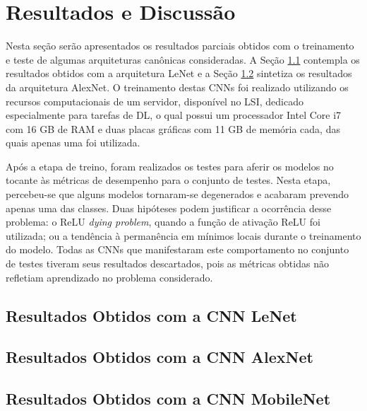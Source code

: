 
\chapter{Resultados e Discussão} \label{cap:resultados}


Nesta seção serão apresentados os resultados parciais obtidos com o treinamento e teste de algumas arquiteturas canônicas consideradas. A Seção \ref{sec:lenet}  contempla os resultados obtidos com a arquitetura LeNet e a Seção  \ref{sec:alexnet} sintetiza os resultados da arquitetura AlexNet. O treinamento destas CNNs foi realizado utilizando os recursos computacionais de um servidor, disponível no LSI, dedicado especialmente para tarefas de DL, o qual possui um processador Intel Core i7 com 16 GB de RAM e duas placas gráficas com 11 GB de memória cada, das quais apenas uma foi utilizada.

Após a etapa de treino, foram realizados os testes para aferir os modelos no tocante às métricas de desempenho para o conjunto de testes. Nesta etapa, percebeu-se que alguns modelos tornaram-se degenerados e acabaram prevendo apenas uma das classes. Duas hipóteses podem justificar a ocorrência desse problema: o ReLU \emph{dying problem}, quando a função de ativação ReLU foi utilizada; ou a tendência à permanência em mínimos locais durante o treinamento do modelo. Todas as CNNs que manifestaram este comportamento no conjunto de testes tiveram seus resultados descartados, pois as métricas obtidas não refletiam aprendizado no problema considerado.


\section{Resultados Obtidos com a CNN LeNet}
\label{sec:lenet}


\section{Resultados Obtidos com a CNN AlexNet}
\label{sec:alexnet}


\section{Resultados Obtidos com a CNN MobileNet}
\label{sec:mobilenet}


